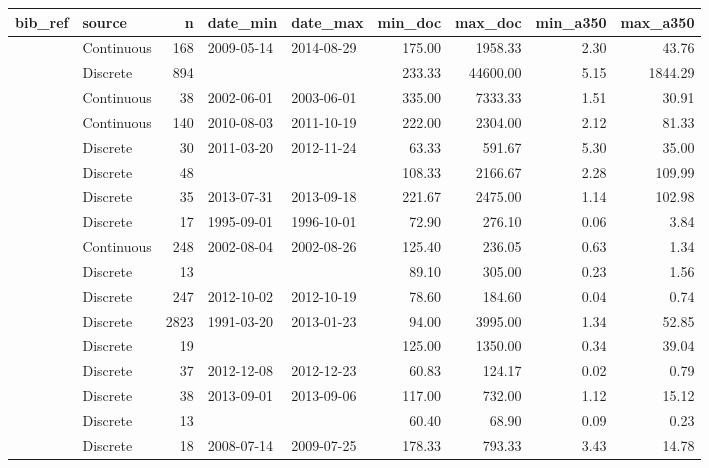 \begin{table}[ht]
\centering
\begingroup\footnotesize
\begin{tabular}{llrllrrrr}
  \hline
bib\_ref & source & n & date\_min & date\_max & min\_doc & max\_doc & min\_a350 & max\_a350 \\ 
  \hline
\citet{agro} & Continuous & 168 & 2009-05-14 & 2014-08-29 & 175.00 & 1958.33 & 2.30 & 43.76 \\ 
  \citet{Aiken2005} & Discrete & 894 &  &  & 233.33 & 44600.00 & 5.15 & 1844.29 \\ 
  \citet{Anderson2007} & Continuous &  38 & 2002-06-01 & 2003-06-01 & 335.00 & 7333.33 & 1.51 & 30.91 \\ 
  \citet{Asmala2014} & Continuous & 140 & 2010-08-03 & 2011-10-19 & 222.00 & 2304.00 & 2.12 & 81.33 \\ 
  \citet{Bouillon2014} & Discrete &  30 & 2011-03-20 & 2012-11-24 & 63.33 & 591.67 & 5.30 & 35.00 \\ 
  \citet{Breton2009} & Discrete &  48 &  &  & 108.33 & 2166.67 & 2.28 & 109.99 \\ 
  \citet{Brezonik2015} & Discrete &  35 & 2013-07-31 & 2013-09-18 & 221.67 & 2475.00 & 1.14 & 102.98 \\ 
  \citet{Castillo1999} & Discrete &  17 & 1995-09-01 & 1996-10-01 & 72.90 & 276.10 & 0.06 & 3.84 \\ 
  \citet{Conan2007} & Continuous & 248 & 2002-08-04 & 2002-08-26 & 125.40 & 236.05 & 0.63 & 1.34 \\ 
  \citet{Delcastillo2000} & Discrete &  13 &  &  & 89.10 & 305.00 & 0.23 & 1.56 \\ 
  \citet{Engel2015} & Discrete & 247 & 2012-10-02 & 2012-10-19 & 78.60 & 184.60 & 0.04 & 0.74 \\ 
  \citet{finish_rivers} & Discrete & 2823 & 1991-03-20 & 2013-01-23 & 94.00 & 3995.00 & 1.34 & 52.85 \\ 
  \citet{Forsstrom2015} & Discrete &  19 &  &  & 125.00 & 1350.00 & 0.34 & 39.04 \\ 
  \citet{Galgani2016} & Discrete &  37 & 2012-12-08 & 2012-12-23 & 60.83 & 124.17 & 0.02 & 0.79 \\ 
  \citet{Goncalves2015} & Discrete &  38 & 2013-09-01 & 2013-09-06 & 117.00 & 732.00 & 1.12 & 15.12 \\ 
  \citet{Gonnelli2016} & Discrete &  13 &  &  & 60.40 & 68.90 & 0.09 & 0.23 \\ 
  \citet{Griffin2011} & Discrete &  18 & 2008-07-14 & 2009-07-25 & 178.33 & 793.33 & 3.43 & 14.78 \\ 

\end{tabular}
\end{table}
